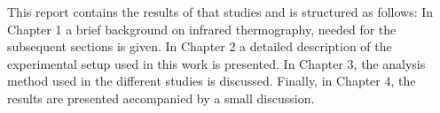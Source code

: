 	This report contains the results of that studies and is structured as follows: In Chapter 1 a brief background on infrared thermography, needed for the subsequent sections is given. In Chapter 2 a detailed description of the experimental setup used in this work is presented. In Chapter 3, the analysis method used in the different studies is discussed. Finally, in Chapter 4, the results are presented accompanied by a small discussion. 